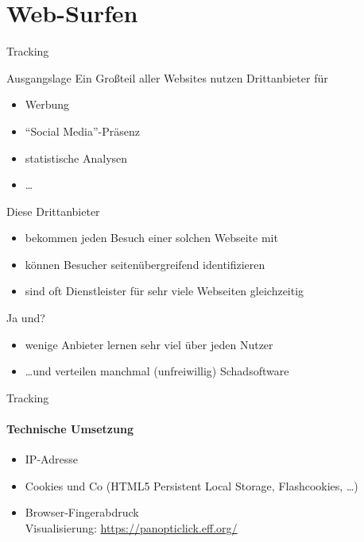 \section{Web-Surfen}
\begin{frame}{Tracking}
  \begin{block}{Ausgangslage}
    Ein Großteil aller Websites nutzen Drittanbieter für
    \begin{itemize}
      \item Werbung
      \item ``Social Media''-Präsenz
      \item statistische Analysen
      \item \ldots
    \end{itemize}
  \end{block}

    \pause
    Diese Drittanbieter
    \begin{itemize}
      \item bekommen jeden Besuch einer solchen Webseite mit
      \pause
      \item können Besucher seitenübergreifend identifizieren
      \pause
      \item sind oft Dienstleister für sehr viele Webseiten gleichzeitig
    \end{itemize}
    \pause
    Ja und?
    \pause
    \begin{itemize}
      \item wenige Anbieter lernen sehr viel über jeden Nutzer
      \pause
      \item \ldots und verteilen manchmal (unfreiwillig) Schadsoftware
    \end{itemize}
  \end{frame}
  \begin{frame}{Tracking}
  \framesubtitle{Technische Umsetzung}
  \begin{itemize}
    \item IP-Adresse
    \item Cookies und Co (HTML5 Persistent Local Storage, Flashcookies, \ldots)
    \item Browser-Fingerabdruck\\
      \scriptsize Visualisierung: \url{https://panopticlick.eff.org/} \normalsize
  \end{itemize}
\end{frame}

